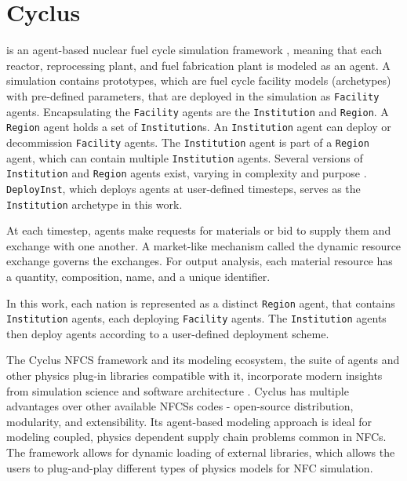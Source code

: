 \section{Cyclus}

\Cyclus is an agent-based nuclear fuel cycle simulation framework 
\cite{huff_fundamental_2016}, meaning
that each reactor, reprocessing plant, and fuel fabrication plant is modeled as an agent.
A \Cyclus simulation contains prototypes, which are fuel cycle facility models (archetypes) with
pre-defined parameters, that are deployed in the simulation as \texttt{Facility} agents.
Encapsulating the \texttt{Facility} agents are the \texttt{Institution} and \texttt{Region}.
A \texttt{Region} agent holds a set of \texttt{Institution}s. 
An \texttt{Institution} agent can deploy or decommission \texttt{Facility} agents.
The \texttt{Institution} agent is part of a \texttt{Region} agent,
which can contain multiple \texttt{Institution} agents. Several versions of \texttt{Institution}
and \texttt{Region} agents exist, varying in complexity and purpose \cite{huff_extensions_2014}.
\texttt{DeployInst}, which deploys agents at user-defined timesteps, serves
as the \texttt{Institution} archetype in this work.

At each timestep,
agents make requests for materials or bid to supply them and exchange
with one another. A market-like mechanism called the dynamic resource exchange
\cite{gidden_agent-based_2015} governs the exchanges.
For output analysis, each material resource has a quantity, composition, name, and a unique identifier.

In this work, each nation is represented as a distinct \texttt{Region} agent,
that contains \texttt{Institution} agents, each deploying  \texttt{Facility} 
agents. The \texttt{Institution} agents then deploy agents according to 
a user-defined deployment scheme.

The Cyclus \gls{NFCS} framework and its
modeling ecosystem, the suite of agents and other
physics plug-in libraries compatible with it, incorporate
modern insights from simulation science and software
architecture \cite{huff_fundamental_2016}. Cyclus
has multiple advantages over other available
\glspl{NFCS} codes - open-source distribution, modularity,
and extensibility. Its agent-based modeling approach
is ideal for modeling coupled, physics dependent
supply chain problems common in \glspl{NFC}.
The framework allows for dynamic loading of 
external libraries, which allows the users to plug-and-play
different types of physics models for \gls{NFC}
simulation.

